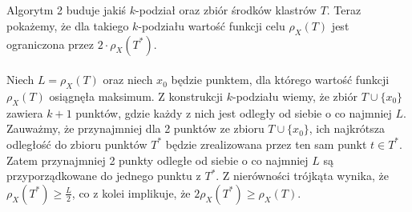 \\~\\
Algorytm 2 buduje jakiś $k$-podział oraz zbiór środków klastrów $T$.
Teraz pokażemy, że dla takiego $k$-podziału wartość funkcji celu $\rho_{X}(T)$ jest ograniczona przez $2 \cdot \rho_{X}(T^{*})$.
\\~\\
Niech $L=\rho_{X}(T)$ oraz niech $x_{0}$ będzie punktem, dla którego wartość funkcji $\rho_{X}(T)$ osiągnęła maksimum.
Z konstrukcji $k$-podziału wiemy, że zbiór $T\cup \{x_{0}\}$ zawiera $k+1$ punktów, gdzie każdy z nich jest odległy od siebie o co najmniej $L$.
Zauważmy, że przynajmniej dla 2 punktów ze zbioru $T\cup \{x_{0}\}$, ich najkrótsza odległość do zbioru punktów $T^{*}$ będzie zrealizowana przez ten sam punkt $t \in T^{*}$.
Zatem przynajmniej 2 punkty odległe od siebie o co najmniej $L$ są przyporządkowane do jednego punktu z $T^{*}$.
Z nierówności trójkąta wynika, że $\rho_{X}(T^{*}) \geq \frac{L}{2}$, co z kolei implikuje, że $2\rho_{X}(T^{*}) \geq \rho_{X}(T)$.